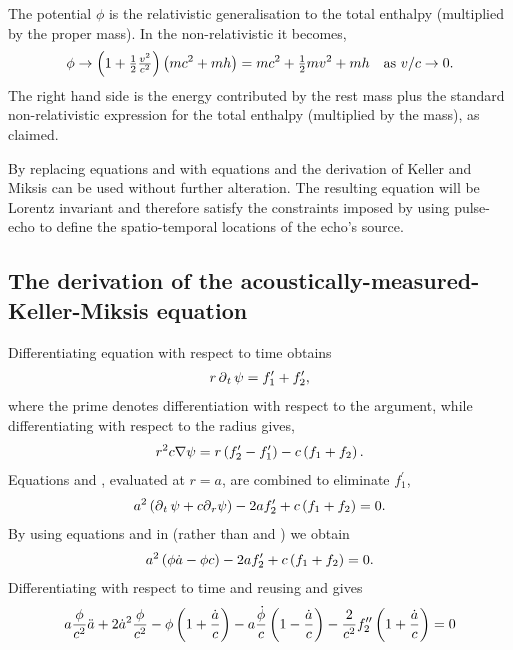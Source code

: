 The potential $\phi$ is the relativistic generalisation to the total enthalpy (multiplied by the proper mass).
In the non-relativistic it becomes, 
\begin{align}
  \phi \rightarrow \left( 1+\tfrac{1}{2}\tfrac{v^2}{c^2} \right) \left( mc^2 + mh \right) = mc^2 + \tfrac{1}{2}m v^2 + mh \text{\quad as ${v/c\rightarrow 0.}$}
\end{align}
The right hand side is the energy contributed by the rest mass plus the  standard non-relativistic expression for the  total enthalpy (multiplied by the mass),
as claimed.

By replacing equations  and  with equations  and  the derivation of Keller and Miksis
can be used without further alteration.
The resulting equation will be Lorentz invariant and therefore satisfy the constraints imposed by using pulse-echo to  define the spatio-temporal locations of the echo's source.


\subsection{The derivation of the acoustically-measured-Keller-Miksis equation}
Differentiating equation  with respect to time obtains
\begin{align}
  r \operatorname{\partial}_t \psi =  f_1^\prime + f_2^\prime, \label{eqn:dtAnsatz}
\end{align}
where the prime denotes differentiation with respect to the argument,
while differentiating with respect to the radius gives,
\begin{align}
 r^2 c \nabla \psi = r \left( f_2^\prime - f_1^\prime \right) - c\left( f_1+f_2 \right). \label{eqn:drAnsatz}
\end{align}
Equations  and , evaluated at $r = a$, are combined to eliminate $f_1^\prime$,
\begin{align}
  a^2 \left( \operatorname{\partial}_t \psi + c {\operatorname{\partial}_r} \psi \right) - 2 a f_2^\prime + c\left( f_1 + f_2 \right) = 0. \label{eqn:Combo1}
\end{align}
By using equations  and  in  (rather than  and ) 
we obtain
\begin{align}
a^2 \left( \phi \dot a -\phi c  \right) - 2 a f_2^\prime + c\left( f_1 + f_2 \right) = 0.  \label{eqn:Combo2}
\end{align}
Differentiating  with respect to time and reusing  and  gives
\begin{align}
  a \frac{\phi}{c^2} \ddot a + 2 {\dot a}^2\frac{\phi}{c^2} - \phi\left( 1 + \frac{\dot a}{c} \right) - a \frac{\dot \phi}{c}\left( 1-\frac{\dot a}{c} \right) - \frac{2}{c^2} f_2^{\prime\prime}\left( 1+\frac{\dot a}{c} \right) = 0
  \label{eqn:Combo3}
\end{align}

